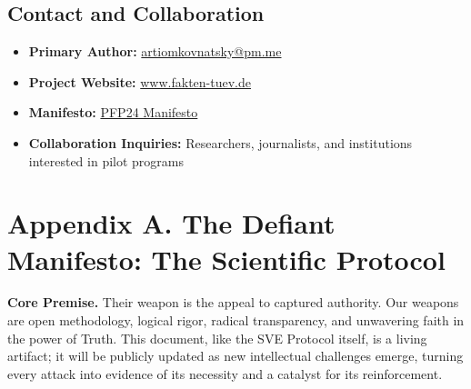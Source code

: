 \documentclass[11pt,a4paper]{article}
\begin{document}
\subsection*{Contact and Collaboration}
\begin{itemize}[leftmargin=*]
    \item \textbf{Primary Author:} \href{mailto:artiomkovnatsky@pm.me}{artiomkovnatsky@pm.me}
    \item \textbf{Project Website:} \href{http://www.fakten-tuev.de}{www.fakten-tuev.de}
    \item \textbf{Manifesto:} \href{https://drive.google.com/file/d/1vWhW7fwFRFLYKHEB67WixuueHssJzQbZ/view?usp=sharing}{PFP24 Manifesto}
    \item \textbf{Collaboration Inquiries:} Researchers, journalists, and institutions interested in pilot programs
\end{itemize}

\clearpage %



\section*{Appendix A. The Defiant Manifesto: The Scientific Protocol}
\label{app:manifesto}

\vspace{1em}

\noindent{}

\vspace{1.5em}

\noindent\textbf{\textcolor{headercolor}{Core Premise.}} Their weapon is the appeal to captured authority. Our weapons are open methodology, logical rigor, radical transparency, and unwavering faith in the power of Truth. This document, like the SVE Protocol itself, is a living artifact; it will be publicly updated as new intellectual challenges emerge, turning every attack into evidence of its necessity and a catalyst for its reinforcement.
\end{document}
